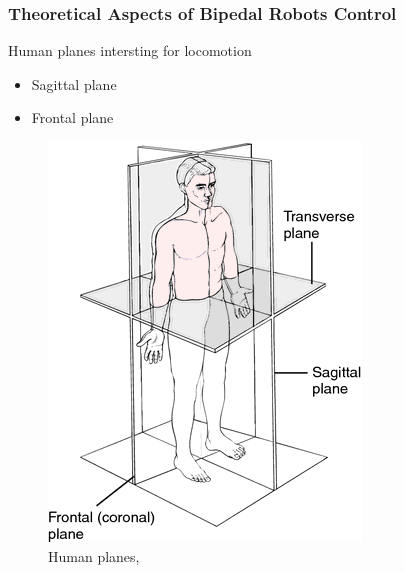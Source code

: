\documentclass{beamer}
\begin{document}
	\begin{frame}
		\frametitle{Theoretical Aspects of Bipedal Robots Control}
		\begin{block}{Human planes intersting for locomotion}
			\begin{itemize}
				\item
					Sagittal plane
				\item
					Frontal plane
					
			\end{itemize}
		\end{block}
		
		\begin{figure}[h!]
			\begin{minipage}[H]{\linewidth}
				\centering
				\includegraphics[width=0.3\linewidth]{presentation_images/12}
				\caption{Human planes, \cite{medical}}
			\end{minipage}
		\end{figure}
	\end{frame}
	
\end{document}
